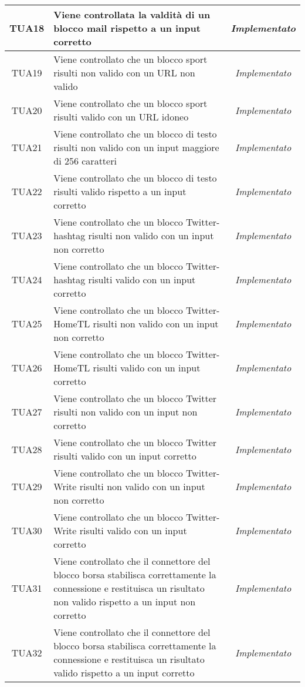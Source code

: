 \begin{longtable}{|c|m{12em}|c|}
TUA18 & Viene controllata la valdità di un blocco mail rispetto a un input corretto & \textit{Implementato}\\ \hline
TUA19 & Viene controllato che un blocco sport risulti non valido con un URL non valido& \textit{Implementato}\\ \hline
TUA20 & Viene controllato che un blocco sport risulti valido con un URL idoneo& \textit{Implementato}\\ \hline
TUA21 & Viene controllato che un blocco di testo risulti non valido con un input maggiore di 256 caratteri& \textit{Implementato}\\ \hline
TUA22 & Viene controllato che un blocco di testo risulti valido rispetto a un input corretto& \textit{Implementato}\\ \hline
TUA23 & Viene controllato che un blocco Twitter-hashtag risulti non valido con un input non corretto& \textit{Implementato}\\ \hline
TUA24 & Viene controllato che un blocco Twitter-hashtag risulti valido con un input corretto& \textit{Implementato}\\ \hline
TUA25 & Viene controllato che un blocco Twitter-HomeTL risulti non valido con un input non corretto& \textit{Implementato}\\ \hline
TUA26 & Viene controllato che un blocco Twitter-HomeTL risulti valido con un input corretto & \textit{Implementato}\\ \hline
TUA27 & Viene controllato che un blocco Twitter risulti non valido con un input non corretto& \textit{Implementato}\\ \hline
TUA28 & Viene controllato che un blocco Twitter risulti valido con un input corretto& \textit{Implementato}\\ \hline
TUA29 & Viene controllato che un blocco Twitter-Write risulti non valido con un input non corretto& \textit{Implementato}\\ \hline
TUA30 & Viene controllato che un blocco Twitter-Write risulti valido con un input corretto& \textit{Implementato}\\ \hline
TUA31 & Viene controllato che il connettore del blocco borsa stabilisca correttamente la connessione e restituisca un risultato non valido rispetto a un input non corretto& \textit{Implementato}\\ \hline
TUA32 & Viene controllato che il connettore del blocco borsa stabilisca correttamente la connessione e restituisca un risultato valido rispetto a un input corretto& \textit{Implementato}\\ \hline

\end{longtable}
